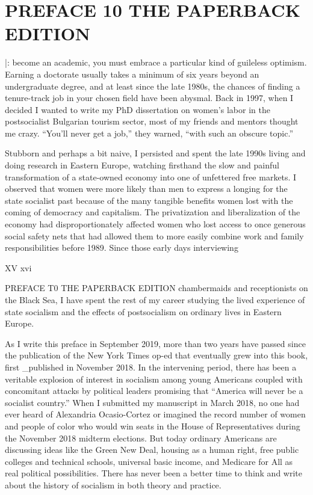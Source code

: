 \chapter{PREFACE 10 THE PAPERBACK EDITION}\label{PREFACE 10 THE PAPERBACK EDITION}
 \par 
|: become an academic, you must embrace a particular kind of guileless optimism. Earning a doctorate usually takes a minimum of six years beyond an undergraduate degree, and at least since the late 1980s, the chances of finding a tenure-track job in your chosen field have been abysmal. Back in 1997, when I decided I wanted to write my PhD dissertation on women’s labor in the postsocialist Bulgarian tourism sector, most of my friends and mentors thought me crazy. “You'll never get a job,” they warned, “with such an obscure topic.”
 \par 
Stubborn and perhaps a bit naive, I persisted and spent the late 1990s living and doing research in Eastern Europe, watching firsthand the slow and painful transformation of a state-owned economy into one of unfettered free markets. I observed that women were more likely than men to express a longing for the state socialist past because of the many tangible benefits women lost with the coming of democracy and capitalism. The privatization and liberalization of the economy had disproportionately affected women who lost access to once generous social safety nets that had allowed them to more easily combine work and family responsibilities before 1989. Since those early days interviewing
 \par 
XV xvi
 \par 
PREFACE T0 THE PAPERBACK EDITION chambermaids and receptionists on the Black Sea, I have spent the rest of my career studying the lived experience of state socialism and the effects of postsocialism on ordinary lives in Eastern Europe.
 \par 
As I write this preface in September 2019, more than two years have passed since the publication of the New York Times op-ed that eventually grew into this book, first _published in November 2018. In the intervening period, there has been a veritable explosion of interest in socialism among young Americans coupled with concomitant attacks by political leaders promising that “America will never be a socialist country.” When I submitted my manuscript in March 2018, no one had ever heard of Alexandria Ocasio-Cortez or imagined the record number of women and people of color who would win seats in the House of Representatives during the November 2018 midterm elections. But today ordinary Americans are discussing ideas like the Green New Deal, housing as a human right, free public colleges and technical schools, universal basic income, and Medicare for All as real political possibilities. There has never been a better time to think and write about the history of socialism in both theory and practice.
